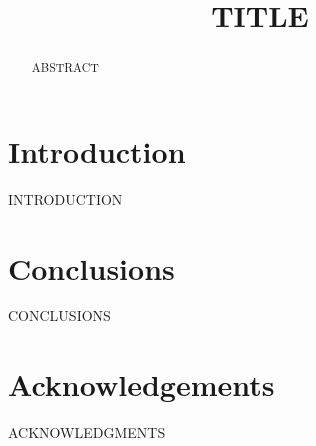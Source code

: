 \documentclass[free]{flammie}
\newif\ifcameraready
\begin{document}
\title{TITLE }


\ifcameraready
\author{AUTHOR \\
    \url{EMAIL} \\
    AFFILIATION \\
}
\fi

\maketitle
\begin{abstract}

    ABSTRACT
\end{abstract}

\section{Introduction}
\label{sec:introduction}

INTRODUCTION

\section{Conclusions}
\label{sec:conclusions}

CONCLUSIONS

\section*{Acknowledgements}

ACKNOWLEDGMENTS



\end{document}
